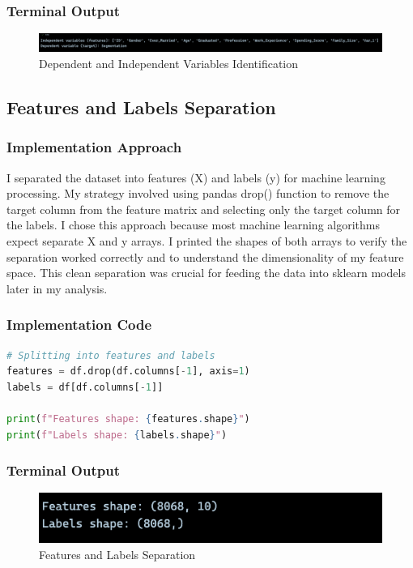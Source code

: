 \documentclass[12pt,a4paper]{article}
\begin{document}
\subsubsection{Terminal Output}
\begin{figure}[h!]
\centering
    \includegraphics[width=\textwidth]{Figures/var_identification.png}
    \caption{Dependent and Independent Variables Identification}
\end{figure}

\newpage
\subsection{Features and Labels Separation}

\subsubsection{Implementation Approach}
I separated the dataset into features (X) and labels (y) for machine learning processing. My strategy involved using pandas drop() function to remove the target column from the feature matrix and selecting only the target column for the labels. I chose this approach because most machine learning algorithms expect separate X and y arrays. I printed the shapes of both arrays to verify the separation worked correctly and to understand the dimensionality of my feature space. This clean separation was crucial for feeding the data into sklearn models later in my analysis.

\subsubsection{Implementation Code}
\begin{lstlisting}[language=Python, caption=Features and Labels Separation]
# Splitting into features and labels
features = df.drop(df.columns[-1], axis=1)
labels = df[df.columns[-1]]

print(f"Features shape: {features.shape}")
print(f"Labels shape: {labels.shape}")
\end{lstlisting}

\subsubsection{Terminal Output}

\begin{figure}[h!]
\centering
    \includegraphics[width=\textwidth]{Figures/features_output.png}
    \caption{Features and Labels Separation}
\end{figure}
\end{document}
